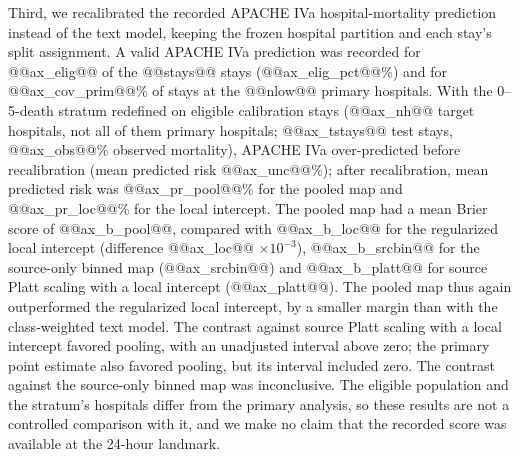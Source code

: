 \documentclass[11pt]{article}
\begin{document}
Third, we recalibrated the recorded APACHE IVa hospital-mortality prediction instead of the text model, keeping the frozen hospital partition and each stay's split assignment. A valid APACHE IVa prediction was recorded for @@ax_elig@@ of the @@stays@@ stays (@@ax_elig_pct@@\%) and for @@ax_cov_prim@@\% of stays at the @@nlow@@ primary hospitals. With the 0--5-death stratum redefined on eligible calibration stays (@@ax_nh@@ target hospitals, not all of them primary hospitals; @@ax_tstays@@ test stays, @@ax_obs@@\% observed mortality), APACHE IVa over-predicted before recalibration (mean predicted risk @@ax_unc@@\%); after recalibration, mean predicted risk was @@ax_pr_pool@@\% for the pooled map and @@ax_pr_loc@@\% for the local intercept. The pooled map had a mean Brier score of @@ax_b_pool@@, compared with @@ax_b_loc@@ for the regularized local intercept (difference @@ax_loc@@ $\times10^{-3}$), @@ax_b_srcbin@@ for the source-only binned map (@@ax_srcbin@@) and @@ax_b_platt@@ for source Platt scaling with a local intercept (@@ax_platt@@). The pooled map thus again outperformed the regularized local intercept, by a smaller margin than with the class-weighted text model. The contrast against source Platt scaling with a local intercept favored pooling, with an unadjusted interval above zero; the primary point estimate also favored pooling, but its interval included zero. The contrast against the source-only binned map was inconclusive. The eligible population and the stratum's hospitals differ from the primary analysis, so these results are not a controlled comparison with it, and we make no claim that the recorded score was available at the 24-hour landmark.
\end{document}
